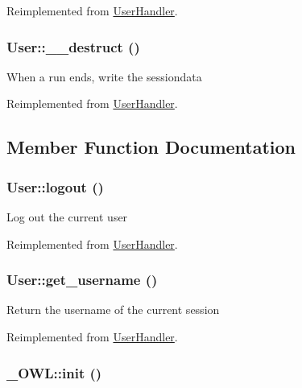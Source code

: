 Reimplemented from \hyperlink{classUserHandler_624054e9693139a3fe5af0ef3b757f04}{UserHandler}.\hypertarget{classUser_ccd20149a7414612c1505e022eb63ffc}{
\subsubsection{\setlength{\rightskip}{0pt plus 5cm}User::\_\-\_\-destruct ()}}
\label{classUser_ccd20149a7414612c1505e022eb63ffc}


When a run ends, write the sessiondata 

Reimplemented from \hyperlink{classUserHandler_3e1f6381ed79caf6e1a255fb0a9cc386}{UserHandler}.

\subsection{Member Function Documentation}
\hypertarget{classUser_06ed977c877b02b420233d4f18a6a668}{
\subsubsection{\setlength{\rightskip}{0pt plus 5cm}User::logout ()}}
\label{classUser_06ed977c877b02b420233d4f18a6a668}


Log out the current user 

Reimplemented from \hyperlink{classUserHandler_8000feaceda9d3c37fc56b6d1969b8f7}{UserHandler}.\hypertarget{classUser_1348ddf190d4df2518665fb51305a902}{
\subsubsection{\setlength{\rightskip}{0pt plus 5cm}User::get\_\-username ()}}
\label{classUser_1348ddf190d4df2518665fb51305a902}


Return the username of the current session 

Reimplemented from \hyperlink{classUserHandler_76e8c8b88c8d92f2d03645e810b9253c}{UserHandler}.\hypertarget{class__OWL_e0ef3ded56e8a6b34b6461e5a721cd3e}{
\subsubsection{\setlength{\rightskip}{0pt plus 5cm}\_\-OWL::init ()}}
\label{class__OWL_e0ef3ded56e8a6b34b6461e5a721cd3e}


